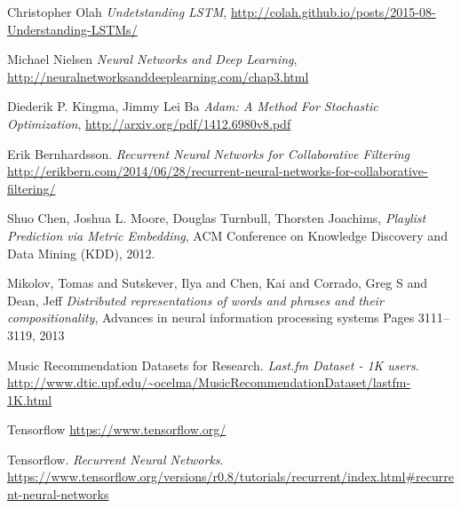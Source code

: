\documentclass{article} %
\begin{document}
\newpage

\begin{thebibliography}{9}

  Christopher Olah
  \emph{Undetstanding LSTM},
\url{http://colah.github.io/posts/2015-08-Understanding-LSTMs/}

  Michael Nielsen
  \emph{Neural Networks and Deep Learning},
\url{http://neuralnetworksanddeeplearning.com/chap3.html}

  Diederik P. Kingma, Jimmy Lei Ba
  \emph{Adam: A Method For Stochastic Optimization},
	\url{http://arxiv.org/pdf/1412.6980v8.pdf}

	Erik Bernhardsson.
	\emph{Recurrent Neural Networks for Collaborative Filtering}
	\url{http://erikbern.com/2014/06/28/recurrent-neural-networks-for-collaborative-filtering/}
	
Shuo Chen, Joshua L. Moore, Douglas Turnbull, Thorsten Joachims, 
\emph{Playlist Prediction via Metric Embedding}, ACM Conference on Knowledge Discovery and Data Mining (KDD), 2012.

Mikolov, Tomas and Sutskever, Ilya and Chen, Kai and Corrado, Greg S and Dean, Jeff
\emph{Distributed representations of words and phrases and their compositionality},
Advances in neural information processing systems Pages 3111--3119, 2013

Music Recommendation Datasets for Research. 
\emph{Last.fm Dataset - 1K users}. 
\url{http://www.dtic.upf.edu/~ocelma/MusicRecommendationDataset/lastfm-1K.html}

Tensorflow
\url{https://www.tensorflow.org/}

Tensorflow. 
\emph{Recurrent Neural Networks}. 
\url{https://www.tensorflow.org/versions/r0.8/tutorials/recurrent/index.html#recurrent-neural-networks}

\end{thebibliography}
\end{document}
